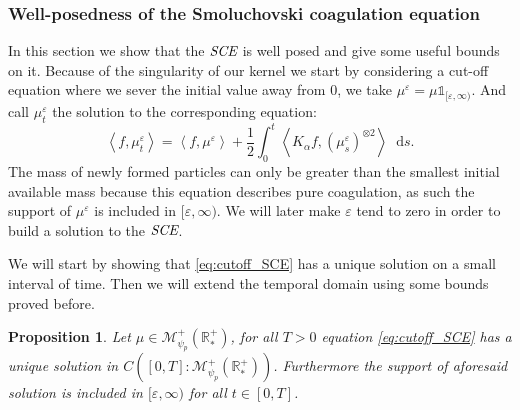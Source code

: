 \documentclass[11pt,a4paper]{article}
\newcommand{\RRP}{\mathbb{R}^+_*}
\newcommand{\MC}{\mathcal{M}}
\newcommand{\SCE}{\emph{SCE}}
\newcommand{\brac}[1]{\left\langle#1\right\rangle}
\newcommand{\dd}{\mathop{}\!\mathrm{d}}
\newtheorem{proposition}[theorem]{Proposition}
\begin{document}
\subsubsection{Well-posedness of the Smoluchovski coagulation equation}
In this section we show that the $\SCE$ is well posed and give some useful bounds on it. Because of the singularity of our kernel we start by considering a cut-off equation where we sever the initial value away from $0$, we take $\mu^\varepsilon = \mu\mathds{1}_{[\varepsilon,\infty)}$. And call $\mu^\varepsilon_t$ the solution to the corresponding equation:
\begin{equation}\label{eq:cutoff_SCE}
    \brac{f, \mu^\varepsilon_t} = \brac{f,\mu^\varepsilon} + \dfrac12\int_0^t \brac{K_\alpha f,\left(\mu^\varepsilon_s\right)^{\otimes 2}} \dd s.
\end{equation}
The mass of newly formed particles can only be greater than the smallest initial available mass because this equation describes pure coagulation, as such the support of $\mu^\varepsilon$ is included in $[\varepsilon,\infty)$. We will later make $\varepsilon$ tend to zero in order to build a solution to the $\SCE$.

We will start by showing that \eqref{eq:cutoff_SCE} has a unique solution on a small interval of time. Then we will extend the temporal domain using some  bounds proved before.
\begin{proposition}\label{prop:well-posedness-cutoff-smol}
    Let $\mu \in \MC^+_{\psi_p}(\RRP)$, for all $T > 0$ equation \eqref{eq:cutoff_SCE} has a unique solution in $C\left([0,T]:\MC^+_{\psi_p}(\RRP)\right)$. Furthermore the support of aforesaid solution is included in $[\varepsilon,\infty)$ for all $t \in [0,T]$.
\end{proposition}
\end{document}

